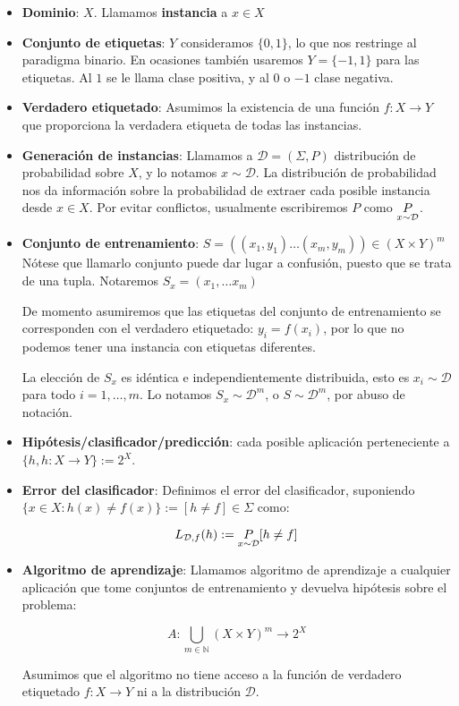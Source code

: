 \begin{itemize}
\item \textbf{Dominio}: $X$. Llamamos \textbf{instancia} a $x\in X$

\item \textbf{Conjunto de etiquetas}: $Y$ consideramos $\{0,1\}$, lo que nos restringe al paradigma binario. En ocasiones 
también usaremos $Y = \{-1,1\}$ para las etiquetas. Al $1$ se le llama clase positiva, y al $0$ o $-1$ clase negativa.

\item \textbf{Verdadero etiquetado}: \sloppy Asumimos la existencia de una función ${f: X \rightarrow Y}$ 
que proporciona la verdadera etiqueta de todas las instancias.

\item \textbf{Generación de instancias}: \fussy Llamamos a $\mathcal{D} = (\Sigma, P)$ distribución de probabilidad sobre $X$,
y lo notamos $x\sim \mathcal{D}$. La distribución de probabilidad nos da información sobre la probabilidad de extraer cada 
posible instancia desde  $x \in X$. Por evitar conflictos, usualmente escribiremos $P$ como $\underset{x\sim \mathcal{D}}{P}$.

\item \textbf{Conjunto de entrenamiento}: $S = ((x_1,y_1) \ldots (x_m,y_m)) \in (X \times Y)^m$ 
Nótese que llamarlo conjunto puede dar lugar a confusión, puesto que se trata de una tupla. Notaremos 
$S_x = (x_1, \ldots x_m)$

De momento asumiremos que las etiquetas del conjunto de entrenamiento se corresponden con el verdadero etiquetado: 
$y_i = f(x_i)$, por lo que no podemos tener una instancia con etiquetas diferentes.

La elección de $S_x$ es idéntica e independientemente distribuida, esto es $x_i \sim \mathcal{D}$ para todo $i=1, \ldots, m$.
Lo notamos $S_x \sim \mathcal{D}^m$, o $S \sim \mathcal{D}^m$, por abuso de notación.

\item \textbf{Hipótesis/clasificador/predicción}: cada posible aplicación perteneciente a 
$\{h, h:X \rightarrow Y\} := 2^{X}$. 

\item \textbf{Error del clasificador}: Definimos el error del clasificador, suponiendo 
$\{x\in X : h(x) \neq f(x)\} := [h\neq f] \in \Sigma$ como:

\[L_{\mathcal{D},f}(h) :=  \underset{x\sim \mathcal{D}}{P} [h \neq f]\]

\item \textbf{Algoritmo de aprendizaje}: Llamamos algoritmo de aprendizaje a cualquier aplicación que tome conjuntos de 
entrenamiento y devuelva hipótesis sobre el problema:

\[A: \underset{m\in \mathbb{N}}{\bigcup} (X\times Y)^m \rightarrow 2^{X}\]

Asumimos que el algoritmo no tiene acceso a la función de verdadero etiquetado $f: X \rightarrow Y$ ni a
la distribución $\mathcal{D}$.
\end{itemize}


